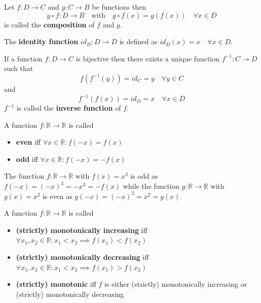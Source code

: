 \begin{definition}
    Let $f: D \to C$ and $g: C \to B$ be functions then $$ g \circ f: D \to B \quad \text{with} \quad g \circ f(x) = g(f(x)) \quad \forall x \in D $$ is called the \textbf{composition} of $f$ and $g$.
\end{definition}

\begin{definition}
    The \textbf{identity function} $id_D: D \to D$ is defined as $id_D(x) = x \quad \forall x \in D$.
\end{definition}

\begin{definition}
    If a function $f: D \to C$ is bijective then there exists a unique function $f^{-1}: C \to D$ such that
    $$f(f^{-1}(y)) = id_C = y \quad \forall y \in C$$
    and
    $$f^{-1}(f(x)) = id_D = x \quad \forall x \in D$$
    $f^{-1}$ is called the \textbf{inverse function} of $f$.
\end{definition}

\begin{definition}
    A function $f: \mathbb{R} \to \mathbb{R}$ is called 
    \begin{itemize}
        \item \textbf{even} iff $\forall x \in \mathbb{R} : f(-x) = f(x)$
        \item \textbf{odd} iff $\forall x \in \mathbb{R} : f(-x) = -f(x)$
    \end{itemize}
\end{definition}

\begin{example}
    The function $f: \mathbb{R} \to \mathbb{R}$ with $f(x) = x^3$ is odd as $f(-x) = (-x)^3 = -x^3 = -f(x)$ while the function $g: \mathbb{R} \to \mathbb{R}$ with $g(x) = x^2$ is even as $g(-x) = (-x)^2 = x^2 = g(x)$.
\end{example}

\begin{definition}
    A function  $f: \mathbb{R} \to \mathbb{R}$ is called 
    \begin{itemize}
        \item \textbf{(strictly) monotonically increasing} iff $\forall x_1, x_2 \in \mathbb{R} : x_1 < x_2 \implies f(x_1) < f(x_2)$
        \item \textbf{(strictly) monotonically decreasing} iff $\forall x_1, x_2 \in \mathbb{R} : x_1 < x_2 \implies f(x_1) > f(x_2)$
        \item \textbf{(strictly) monotonic} iff $f$ is either (strictly) monotonically increasing or (strictly) monotonically decreasing
    \end{itemize}
\end{definition}

